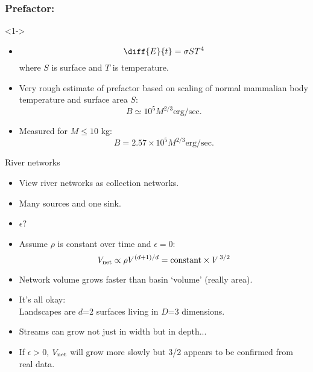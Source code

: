 \begin{frame}
  \frametitle{Prefactor:}

  \begin{block}<1->{}
    \begin{itemize}
    \item<+->
      $$\diff{E}{t} = \sigma S T^{4}$$
      where $S$ is surface and $T$ is temperature.
    \item<+-> 
      Very rough estimate of prefactor based on scaling
      of normal mammalian body temperature and surface
      area $S$:
      $$B \simeq 10^{5}M^{2/3} \mbox{erg/sec}.$$
    \item<+->
      Measured for $M \leq 10$ kg:
      $$B=2.57\times 10^5M^{2/3} \mbox{erg/sec}.$$
    \end{itemize}
  \end{block}

\end{frame}


\begin{frame}

  \begin{block}{River networks}
    \begin{itemize}
    \item<+-> 
      View river networks as collection networks.
    \item<+-> 
      Many sources and one sink.
    \item<+-> 
      $\epsilon$?
    \item<+-> 
      Assume $\rho$ is constant over time and $\epsilon=0$:
      $$V_{\textnormal{net}} \propto \rho V^{(d+1)/d} = \mbox{constant} \times V^{\, 3/2} $$
    \item<+-> 
      Network volume grows faster than
      basin `volume' (really area).
    \item<+-> 
      \alert{It's all okay:}\\ 
      Landscapes are $d$=2 surfaces living in $D$=3 dimensions.
    \item<+->
      Streams can grow not just in width but in depth...
    \item<+->
      If $\epsilon > 0$, $V_{\textnormal{net}}$ will grow more slowly
      but 3/2 appears to be confirmed from real data.
    \end{itemize}
  \end{block}

\end{frame}


